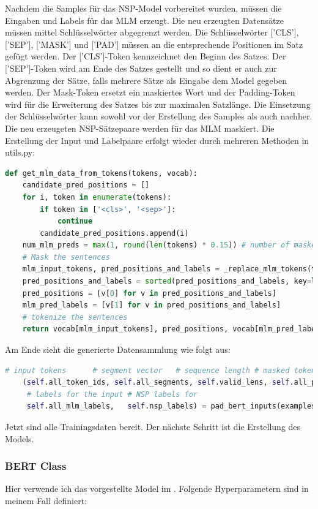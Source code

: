 Nachdem die Samples für das NSP-Model vorbereitet wurden, müssen die Eingaben und Labels für das MLM erzeugt. Die neu erzeugten Datensätze müssen mittel Schlüsselwörter abgegrenzt werden. Die Schlüsselwörter ['CLS'], ['SEP'], ['MASK'] und ['PAD'] müssen an die entsprechende Positionen im Satz gefügt werden. Der ['CLS']-Token kennzeichnet den Beginn des Satzes. Der ['SEP']-Token wird am Ende des Satzes gestellt und so dient er auch zur Abgrenzung der Sätze, falls mehrere Sätze als Eingabe dem Model gegeben werden. Der Mask-Token ersetzt ein maskiertes Wort und der Padding-Token wird für die Erweiterung des Satzes bis zur maximalen Satzlänge. Die Einsetzung der Schlüsselwörter kann sowohl vor der Erstellung des Samples als auch nachher. Die neu erzeugeten NSP-Sätzepaare werden für das MLM maskiert. Die Erstellung der Input und Labelpaare erfolgt wieder durch mehreren Methoden in utils.py:

\begin{lstlisting}[language=Python, caption={Erstellen von Trainingsdaten für MLM}]
def get_mlm_data_from_tokens(tokens, vocab):
	candidate_pred_positions = []
	for i, token in enumerate(tokens):
		if token in ['<cls>', '<sep>']:
			continue
		candidate_pred_positions.append(i)
	num_mlm_preds = max(1, round(len(tokens) * 0.15)) # number of masked tokens
	# Mask the sentences
	mlm_input_tokens, pred_positions_and_labels = _replace_mlm_tokens(tokens, candidate_pred_positions, num_mlm_preds, vocab)
	pred_positions_and_labels = sorted(pred_positions_and_labels, key=lambda x: x[0])
	pred_positions = [v[0] for v in pred_positions_and_labels]
	mlm_pred_labels = [v[1] for v in pred_positions_and_labels]
	# tokenize the sentences
	return vocab[mlm_input_tokens], pred_positions, vocab[mlm_pred_labels]
\end{lstlisting}

Am Ende sieht die generierte Datensammlung wie folgt aus:
\begin{lstlisting}[language=Python, caption={Eingabedaten}]
	 # input tokens    	 # segment vector	# sequence length # masked token index	  # weights for the label
	(self.all_token_ids, self.all_segments, self.valid_lens, self.all_pred_positions, self.all_mlm_weights,
	 # labels for the input # NSP labels for
	 self.all_mlm_labels, 	self.nsp_labels) = pad_bert_inputs(examples, max_len, self.vocab)
\end{lstlisting}

Jetzt sind alle Trainingsdaten bereit. Der nächste Schritt ist die Erstellung des Models. 
\subsubsection{BERT Class}\label{bert_class}
Hier verwende ich das vorgestellte Model im \cite{BERT:19}. Folgende Hyperparametern sind in meinem Fall definiert:

